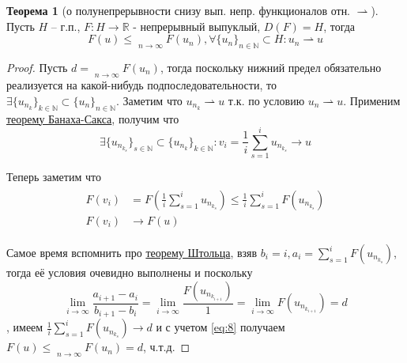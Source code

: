 \documentclass[12pt,a4paper]{article}
\theoremstyle{definition}
\newtheorem{theorem}{Теорема}
\newcommand{\Real}{\mathbb{R}}
\newcommand{\Natural}{\mathbb{N}}
\DeclareMathOperator*\lowlim{\underline{lim}}
\newcommand{\seq}[2]{\{#1\}_{#2}}
\newcommand{\weakto}{\rightharpoonup}
\begin{document}
\begin{theorem}[о полунепрерывности снизу вып. непр. функционалов отн. $\weakto$]
	Пусть $H$ -- г.п., $F: H \to \Real$ - непрерывный выпуклый, $D(F) = H$, тогда $$F(u) \leq \lowlim\limits_{n\to\infty}{F(u_n)}, \forall \seq{u_n}{n\in\Natural}\subset H: u_n \weakto u$$
\end{theorem}
\begin{proof}
	Пусть $d = \lowlim\limits_{n\to\infty}{F(u_n)}$, тогда поскольку нижний предел обязательно реализуется на какой-нибудь подпоследовательности, то \\ $\exists \seq{u_{n_k}}{k\in\Natural} \subset \seq{u_n}{n\in\Natural}$. Заметим что $u_{n_k} \weakto u$ т.к. по условию $u_n \weakto u$. Применим \hyperref[th:6]{теорему Банаха-Сакса}, получим что 
	$$\exists\seq{u_{n_{k_s}}}{s\in\Natural}\subset\seq{u_{n_k}}{k\in\Natural}: v_i = \frac{1}{i}\sum_{s=1}^{i}{u_{n_{k_s}}} \to u$$
	
	Теперь заметим что
	\begin{align}\label{eq:8}
		\begin{split}
		F(v_i) &= F\left(\frac{1}{i} \sum_{s=1}^{i}{u_{n_{k_s}}}\right) \leq \frac{1}{i}\sum\limits_{s=1}^{i}{F(u_{n_{k_s}})} \\
		F(v_i) &\to F(u)
		\end{split}
	\end{align}
	
	Самое время вспомнить про \hyperref[prop:1]{теорему Штольца}, взяв $b_i = i, a_i = \sum\limits_{s=1}^{i}{F(u_{n_{k_s}})}$, тогда
	её условия очевидно выполнены и поскольку
	$$\lim_{i\to\infty}{\frac{a_{i+1} - a_i}{b_{i+1} - b_i}}=
	\lim_{i\to\infty}{\frac{F(u_{n_{k_{i+1}}})}{1}} = \lim_{i\to\infty}{F(u_{n_{k_{i+1}}})} = d$$
	, имеем $\frac{1}{i}\sum\limits_{s=1}^{i}{F(u_{n_{k_s}})} \to d$ и с учетом \eqref{eq:8} получаем $F(u) \leq \lowlim\limits_{n\to\infty}{F(u_n)} = d$, ч.т.д.
\end{proof} 



\newpage
\renewcommand{\listtheoremname}{Список теорем и утверждений}
\listoftheorems[ignoreall, show={theorem,corollary}]
\end{document}
